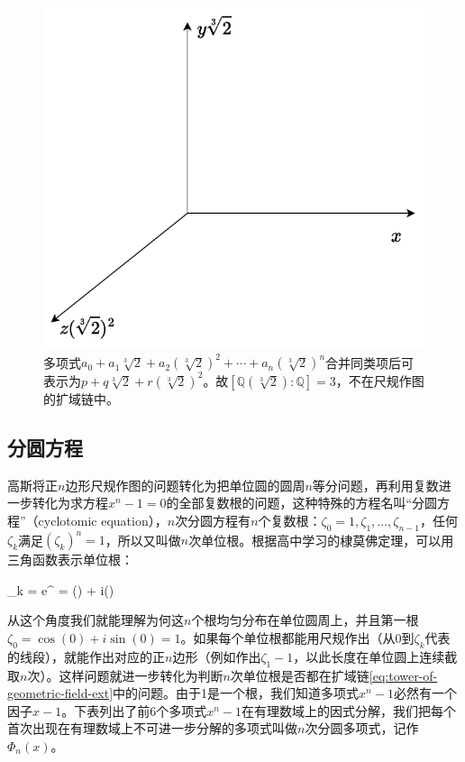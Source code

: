 \begin{figure}[htbp]
 \centering
 \includegraphics[scale=0.5]{../img/double-cube}
 \caption{多项式$a_0 + a_1\sqrt[3]{2} + a_2(\sqrt[3]{2})^2 + \dotsb + a_n(\sqrt[3]{2})^n$合并同类项后可表示为$p + q\sqrt[3]{2} + r(\sqrt[3]{2})^2$。故$[\mathbb{Q}(\sqrt[3]{2}) : \mathbb{Q}] = 3$，不在尺规作图的扩域链中。}
 \label{fig:double-cube}
\end{figure}

\subsection{分圆方程}
高斯将正$n$边形尺规作图的问题转化为把单位圆的圆周$n$等分问题，再利用复数进一步转化为求方程$x^n - 1 = 0$的全部复数根的问题，这种特殊的方程名叫“分圆方程”（cyclotomic equation），$n$次分圆方程有$n$个复数根：$\zeta_0 = 1, \zeta_1, \dotsc, \zeta_{n-1}$，任何$\zeta_k$满足$(\zeta_k)^n = 1$，所以又叫做$n$次单位根。根据高中学习的棣莫佛定理，可以用三角函数表示单位根：

\be
\zeta_k = e^{} = \cos() + i\sin()
\ee

从这个角度我们就能理解为何这$n$个根均匀分布在单位圆周上，并且第一根$\zeta_0 = \cos(0) + i\sin(0) = 1$。如果每个单位根都能用尺规作出（从0到$\zeta_k$代表的线段），就能作出对应的正$n$边形（例如作出$\zeta_1 - 1$，以此长度在单位圆上连续截取$n$次）。这样问题就进一步转化为判断$n$次单位根是否都在扩域链\cref{eq:tower-of-geometric-field-ext}中的问题。由于1是一个根，我们知道多项式$x^n - 1$必然有一个因子$x - 1$。下表列出了前6个多项式$x^n - 1$在有理数域上的因式分解，我们把每个首次出现在有理数域上不可进一步分解的多项式叫做$n$次分圆多项式，记作$\Phi_n(x)$。

